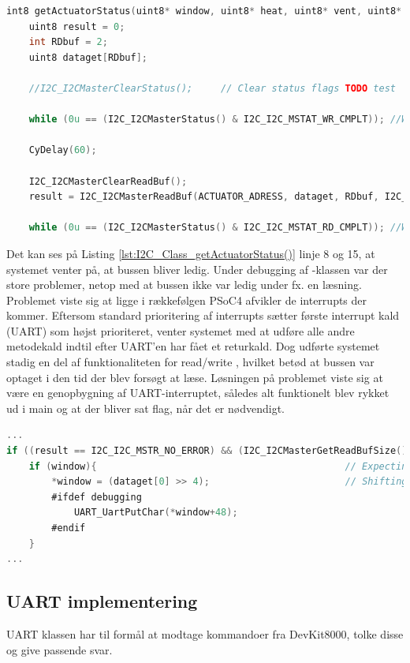 \begin{lstlisting}[language=C,caption=Implementering af getActuatorStatus(),label=lst:I2C_Class_getActuatorStatus()]
int8 getActuatorStatus(uint8* window, uint8* heat, uint8* vent, uint8* irrigation){
    uint8 result = 0;
    int RDbuf = 2;
    uint8 dataget[RDbuf];
    
    //I2C_I2CMasterClearStatus();     // Clear status flags TODO test
    
    while (0u == (I2C_I2CMasterStatus() & I2C_I2C_MSTAT_WR_CMPLT)); //Wait for the bus to be ready
    
    CyDelay(60);
    
    I2C_I2CMasterClearReadBuf();
    result = I2C_I2CMasterReadBuf(ACTUATOR_ADRESS, dataget, RDbuf, I2C_I2C_MODE_COMPLETE_XFER);
    
    while (0u == (I2C_I2CMasterStatus() & I2C_I2C_MSTAT_RD_CMPLT)); //Wait for the dataget array to be updated
\end{lstlisting}

Det kan ses på Listing \ref{lst:I2C_Class_getActuatorStatus()} linje 8 og 15, at systemet venter på, at bussen bliver ledig. Under debugging af \IIC-klassen var der store problemer, netop med at bussen ikke var ledig under fx. en læsning. Problemet viste sig at ligge i rækkefølgen PSoC4 afvikler de interrupts der kommer. Eftersom standard prioritering af interrupts sætter første interrupt kald (UART) som højst prioriteret, venter systemet med at udføre alle andre metodekald indtil efter UART'en har fået et returkald. Dog udførte systemet stadig en del af funktionaliteten for read/write \IIC, hvilket betød at bussen var optaget i den tid der blev forsøgt at læse. Løsningen på problemet viste sig at være en genopbygning af UART-interruptet, således alt funktionelt blev rykket ud i main og at der bliver sat flag, når det er nødvendigt.

\begin{lstlisting}[language=C,caption=Implementering af getActuatorStatus(),label=lst:I2C_Class_getActuatorStatus()]
...
if ((result == I2C_I2C_MSTR_NO_ERROR) && (I2C_I2CMasterGetReadBufSize() != 0)){
	if (window){                                   			// Expecting to receive MSB first 
    	*window = (dataget[0] >> 4);      					// Shifting out the 4 LSB.
        #ifdef debugging
        	UART_UartPutChar(*window+48);
        #endif
	}
...
\end{lstlisting}



\subsection{UART implementering}
UART klassen har til formål at modtage kommandoer fra DevKit8000, tolke disse og give passende svar. 

